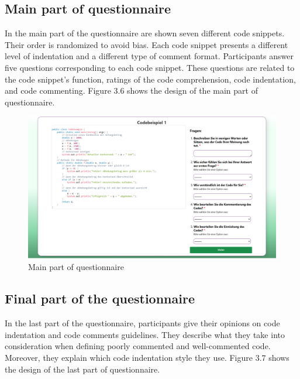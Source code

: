 \subsection{Main part of questionnaire}

In the main part of the questionnaire are shown seven different code snippets. Their order is randomized to avoid bias. Each code snippet presents a different level of indentation and a different type of comment format.
Participants answer five questions corresponding to each code snippet. These questions are related to the code snippet’s function, ratings of the code comprehension, code indentation, and code commenting. Figure 3.6 shows the design of the main part of questionnaire.


\begin{figure} [H]
  \centering
  \includegraphics[scale=0.45]{figures/main_p.png}
  \caption{Main part of questionnaire}
  \label{fig:AnhangsChor}
\end{figure}



\subsection{Final part of the questionnaire}
In the last part of the questionnaire, participants give their opinions on code indentation and code comments guidelines. They describe what they take into consideration when defining poorly commented and well-commented code. Moreover, they explain which code indentation style they use.  Figure 3.7 shows the design of the last part of questionnaire.


